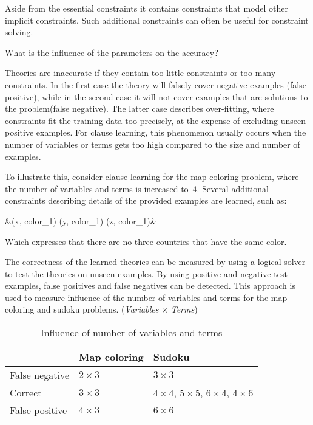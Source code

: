 Aside from the essential constraints it contains constraints that model other implicit constraints.
Such additional constraints can often be useful for constraint solving.

\begin{question}
	What is the influence of the parameters on the accuracy?
	\label{q:cd_acc_influence}
\end{question}

\begin{observation}
	Theories are inaccurate if they contain too little constraints or too many constraints.
	In the first case the theory will falsely cover negative examples (false positive), while in the second case it will not cover examples that are solutions to the problem(false negative).
	The latter case describes over-fitting, where constraints fit the training data too precisely, at the expense of excluding unseen positive examples.
	For clause learning, this phenomenon usually occurs when the number of variables or terms gets too high compared to the size and number of examples.

	To illustrate this, consider clause learning for the map coloring problem, where the number of variables and terms is increased to~$4$.
	Several additional constraints describing details of the provided examples are learned, such as: 
	\begin{shiftedflalign*}
		 &\leftarrow {}(x, color_1) \land {}(y, color_1)  \land {}(z, color_1)&
	\end{shiftedflalign*}
 	Which expresses that there are no three countries that have the same color.
\end{observation}

\begin{experiment}
	\label{exp:cd_acc_influence_par}
	The correctness of the learned theories can be measured by using a logical solver to test the theories on unseen examples.
	By using positive and negative test examples, false positives and false negatives can be detected.
	This approach is used to measure influence of the number of variables and terms for the map coloring and sudoku problems.
	(\emph{Variables} $\times$ \emph{Terms})

	\begin{table}[!htp]
		\begin{tabularx}{\textwidth}{l|ll}
			 & \textbf{Map coloring}		& \textbf{Sudoku} \\
			\toprule
			False negative 	& $2 \times 3$				& $3 \times 3$ \\
			Correct 		& $3 \times 3$				& $4 \times 4$, $5 \times 5$, $6 \times 4$, $4 \times 6$ \\
			False positive 	& $4 \times 3$				& $6 \times 6$	\\
		\end{tabularx}
		\label{tbl:cd_acc_influence}
		\caption{Influence of number of variables and terms}
	\end{table}

\end{experiment}

